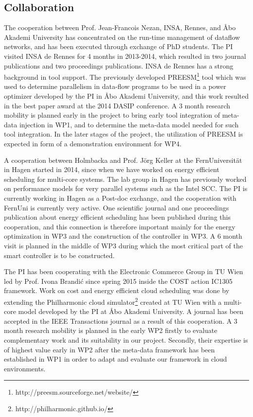 \documentclass{article}
\begin{document}
\subsection{Collaboration}
The cooperation between Prof. Jean-Francois Nezan, INSA, Rennes, and \AA{}bo Akademi University has concentrated on the run-time management of dataflow networks, 
and has been executed through exchange of PhD students.
The PI visited INSA de Rennes for 4 months in 2013-2014, which resulted in two journal publications and two proceedings publications.\smallskip
INSA de Rennes has a strong background in tool support. 
The previously developed PREESM\footnote{http://preesm.sourceforge.net/website/} tool which was used to determine parallelism in data-flow programs to be used in a power optimizer developed by the PI in \AA{}bo Akademi University, and this work resulted in the best paper award at the 2014 DASIP conference.
A 3 month research mobility is planned early in the project to bring early tool integration of meta-data injection in WP1, and to determine the meta-data model needed for such tool integration.
In the later stages of the project, the utilization of PREESM is expected in form of a demonstration environment for WP4.\smallskip

A cooperation between Holmbacka and Prof. J\"{o}rg Keller at the FernUniversit\"{a}t in Hagen started in 2014, since when we have worked on energy efficient scheduling for multi-core systems. 
The lab group in Hagen has previously worked on performance models for very parallel systems such as the Intel SCC.
The PI is currently working in Hagen as a Post-doc exchange, and the cooperation with FernUni is currently very active.
One scientific journal and one proceedings publication about energy efficient scheduling has been published during this cooperation,
and this connection is therefore important mainly for the energy optimization in WP3 and the construction of the controller in WP3.
A 6 month visit is planned in the middle of WP3 during which the most critical part of the smart controller is to be constructed.
\smallskip

The PI has been cooperating with the Electronic Commerce Group in TU Wien led by Prof. Ivona Brandi\'{c} since spring 2015 inside the COST action IC1305 framework. 
Work on cost and energy efficient cloud scheduling was done by extending the Philharmonic cloud simulator\footnote{http://philharmonic.github.io/} created at TU Wien with a multi-core model developed by the PI at \AA{}bo Akademi University. 
A journal has been accepted in the IEEE Transactions journal as a result of this cooperation.
A 3 month research mobility is planned in the early WP2 firstly to evaluate complementary work and its suitability in our project.
Secondly, their expertise is of highest value early in WP2 after the meta-data framework has been established in WP1 in order to adapt and evaluate our framework in cloud environments.
\smallskip 
\end{document}
